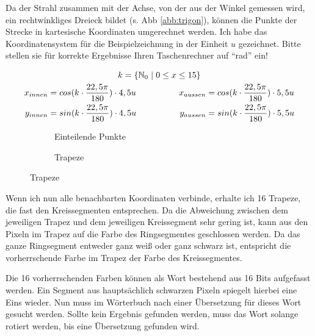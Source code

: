 Da der Strahl zusammen mit der Achse, von der aus der Winkel gemessen wird, ein rechtwinkliges Dreieck bildet (s. Abb \ref{abb:trigon}), können die Punkte der Strecke in kartesische Koordinaten umgerechnet werden. Ich habe das Koordinatensystem für die Beispielzeichnung in der Einheit \(u\) gezeichnet. Bitte stellen sie für korrekte Ergebnisse Ihren Taschenrechner auf "`rad"' ein!

\begin{gather}
k = \{\mathbb{N}_0 \hspace{0.3em}|\hspace{0.3em} 0 \le x \le 15\} \\
\begin{split}
x_{innen} &= cos(k \cdot \frac{22,5\pi}{180}) \cdot 4,5u \\
y_{innen} &= sin(k \cdot \frac{22,5\pi}{180}) \cdot 4,5u
\end{split}
\hspace{5em}
\begin{split}
x_{aussen} &= cos(k \cdot \frac{22,5\pi}{180}) \cdot 5,5u \\
y_{aussen} &= sin(k \cdot \frac{22,5\pi}{180}) \cdot 5,5u
\end{split}
\end{gather}

\begin{figure}[!ht]
	\begin{subfigure}[b]{0.5\textwidth}
		\centering	
		
		\caption{Einteilende Punkte}
	\end{subfigure}
	\begin{subfigure}[b]{0.5\textwidth}
		\centering	
		
		\caption{Trapeze}
	\end{subfigure}
\end{figure}

Wenn ich nun alle benachbarten Koordinaten verbinde, erhalte ich 16 Trapeze, die fast den Kreissegmenten entsprechen. Da die Abweichung zwischen dem jeweiligen Trapez und dem jeweiligen Kreissegment sehr gering ist, kann aus den Pixeln im Trapez auf die Farbe des Ringsegmentes geschlossen werden. Da das ganze Ringsegment entweder ganz weiß oder ganz schwarz ist, entspricht die vorherrschende Farbe im Trapez der Farbe des Kreissegmentes.

Die 16 vorherrschenden Farben können als Wort bestehend aus 16 Bits aufgefasst werden. Ein Segment aus hauptsächlich schwarzen Pixeln spiegelt hierbei eine Eins wieder. Nun muss im Wörterbuch nach einer Übersetzung für dieses Wort gesucht werden. Sollte kein Ergebnis gefunden werden, muss das Wort solange rotiert werden, bis eine Übersetzung gefunden wird.


